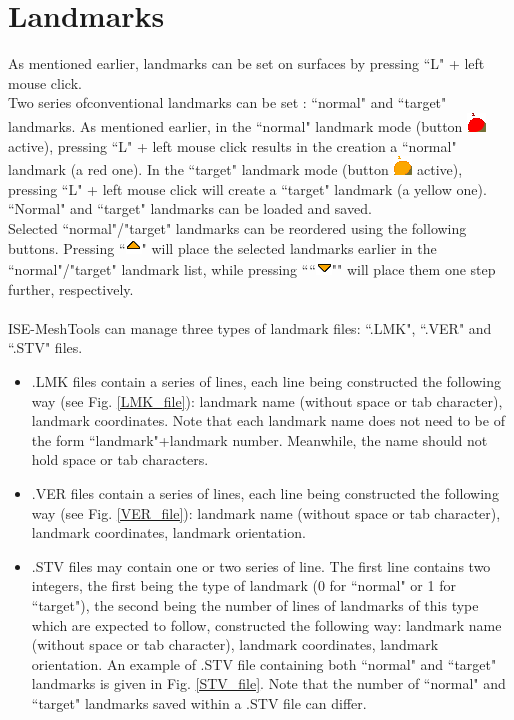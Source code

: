 \section{Landmarks}
As mentioned earlier, landmarks can be set on surfaces by pressing ``L" + left mouse click.\\

Two series ofconventional landmarks can be set : ``normal" and ``target" landmarks. As mentioned earlier, in the ``normal" landmark mode (button \includegraphics[scale=0.7]{images/pixmap/Landmarks4.png} active), pressing ``L" + left mouse click results in
the creation a ``normal" landmark (a red one). In the ``target" landmark mode (button \includegraphics[scale=0.7]{images/pixmap/Landmarks6.png} active),
pressing ``L" + left mouse click will create a ``target" landmark (a yellow one). ``Normal" and ``target" landmarks can be loaded and saved.\\
Selected ``normal"/"target" landmarks can be reordered using the following buttons. Pressing ``\includegraphics[scale=0.7]{images/pixmap/s_dessous_17.png}"
will place the selected landmarks earlier in the ``normal"/"target" landmark list, while pressing ````\includegraphics[scale=0.7]{images/pixmap/s_dessus_17.png}""
will place them one step further, respectively.\\\\
ISE-MeshTools can manage three types of landmark files: ``.LMK", ``.VER" and ``.STV" files.
\begin{itemize}
\item 
 .LMK files contain a series of lines, each line
being constructed the following way (see Fig. \ref{LMK_file}): landmark
name (without space or tab character),
landmark coordinates. Note that each landmark name does not need to be of the form ``landmark"+landmark number. Meanwhile, the name should not hold space or tab
characters.
\item .VER files contain a series
of lines, each line being
constructed the following
way (see Fig. \ref{VER_file}): landmark name (without space or tab character), landmark coordinates, landmark orientation.
\item .STV files may contain one or two series of line. The first line contains two integers, the first being the type of landmark (0 for ``normal" or 1 for ``target"), the second being the number of lines of landmarks of this type which are expected to follow, constructed the following way: landmark name (without space or tab character), landmark coordinates, landmark orientation. An example of .STV file containing both ``normal" and ``target" landmarks is given in Fig. \ref{STV_file}. Note that the number of ``normal" and ``target" landmarks saved within a .STV file can differ.
\end{itemize}
